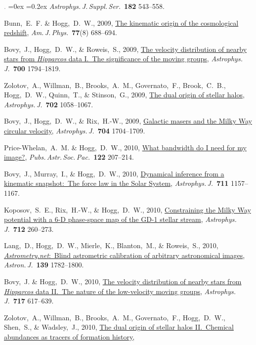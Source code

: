 \documentclass[12pt,letterpaper]{article}
\newcommand{\satellite}[1]{\textsl{#1}}
\newcommand{\project}[1]{\textsl{#1}}
\newcommand{\doi}[2]{\href{http://dx.doi.org/#1}{{#2}}}
\newcommand{\deemph}[1]{\textcolor{grey}{\footnotesize{#1}}}
\newcommand{\pubnumber}[1]{\deemph{{#1}.}}
\newcounter{refpubnum}
\newcommand{\hogglist}{%
    \rightmargin=0in
    \leftmargin=0.18in
    \topsep=0ex
    \partopsep=0pt
    \itemsep=0.2ex
    \parsep=0pt
    \itemindent=-1.0\leftmargin
    \listparindent=0.0\leftmargin
    \settowidth{\labelsep}{~}
    \usecounter{refpubnum}
  }
\begin{document}
\begin{list}{\pubnumber{\therefpubnum}}{\hogglist}
\textit{Astrophys.\,J.\,Suppl.\,Ser.}\ \textbf{182} 543--558.
\item
Bunn,~E.~F. \& Hogg,~D.~W., 2009,
\doi{10.1119/1.3129103}{The kinematic origin of the cosmological redshift},
\textit{Am.\,J.\,Phys.}\ \textbf{77}(8) 688--694.
\item
Bovy,~J., Hogg,~D.~W., \& Roweis,~S., 2009,
\doi{10.1088/0004-637X/700/2/1794}{The velocity distribution of nearby stars from \satellite{Hipparcos} data I.~The significance of the moving groups},
\textit{Astrophys.\,J.}\ \textbf{700} 1794--1819.
\item
Zolotov,~A., Willman,~B., Brooks,~A.~M., Governato,~F., Brook,~C.~B., Hogg,~D.~W., Quinn,~T., \& Stinson,~G., 2009,
\doi{10.1088/0004-637X/702/2/1058}{The dual origin of stellar halos},
\textit{Astrophys.\,J.}\ \textbf{702} 1058--1067.
\item
Bovy,~J., Hogg,~D.~W., \& Rix,~H.-W., 2009,
\doi{10.1088/0004-637X/704/2/1704}{Galactic masers and the Milky Way circular velocity},
\textit{Astrophys.\,J.}\ \textbf{704} 1704--1709.
\item
Price-Whelan,~A.~M. \& Hogg,~D.~W., 2010,
\doi{10.1086/651009}{What bandwidth do I need for my image?},
\textit{Pubs.\,Astr.\,Soc.\,Pac.}\ \textbf{122} 207--214.
\item
Bovy,~J., Murray,~I., \& Hogg,~D.~W., 2010,
\doi{10.1088/0004-637X/711/2/1157}{Dynamical inference from a kinematic snapshot:\ The force law in the Solar System},
\textit{Astrophys.\,J.}\ \textbf{711} 1157--1167.
\item
Koposov,~S.~E., Rix,~H.-W., \& Hogg,~D.~W., 2010,
\doi{10.1088/0004-637X/712/1/260}{Constraining the Milky Way potential with a 6-D phase-space map of the GD-1 stellar stream},
\textit{Astrophys.\,J.}\ \textbf{712} 260--273.
\item
Lang,~D., Hogg,~D.~W., Mierle,~K., Blanton,~M., \& Roweis,~S., 2010,
\doi{10.1088/0004-6256/139/5/1782}{\project{Astrometry.net}:\ Blind astrometric calibration of arbitrary astronomical images},
\textit{Astron.\,J.}\ \textbf{139} 1782--1800.
\item
Bovy,~J. \& Hogg,~D.~W., 2010,
\doi{10.1088/0004-637X/717/2/617}{The velocity distribution of nearby stars from \project{Hipparcos} data II.\ The nature of the low-velocity moving groups},
\textit{Astrophys.\,J.}\ \textbf{717} 617--639.
\item
Zolotov,~A., Willman,~B., Brooks,~A.~M., Governato,~F., Hogg,~D.~W., Shen,~S., \& Wadsley,~J., 2010,
\doi{10.1088/0004-637X/721/1/738}{The dual origin of stellar halos II.\ Chemical abundances as tracers of formation history},

\end{list}
\end{document}
